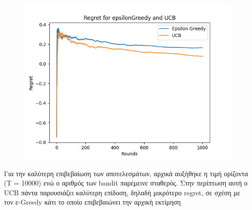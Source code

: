 \begin{figure}[h]
\begin{minipage}{.33\textwidth}
		\includegraphics[width=\linewidth]{Images/regret_1000_100.png}
		\label{fig:epsilon_1000_100}
	  \end{minipage}
	\end{figure}

\noindent
Για την καλύτερη επιβεβαίωση των αποτελεσμάτων, αρχικά αυξήθηκε η τιμή ορίζοντα (Τ = 10000) ενώ ο αριθμός των bandit παρέμεινε σταθερός. Στην περίπτωση αυτή ο UCB πάντα παρουσιάζει καλύτερη επίδοση, δηλαδή μικρότερο regret, σε σχέση με τον ε-Greedy κάτι το οποίο επιβεβαιώνει την αρχική εκτίμηση 

